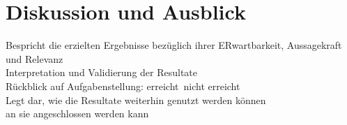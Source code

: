 
\chapter{Diskussion und Ausblick}\label{chap.diskussion}

Bespricht die erzielten Ergebnisse bezüglich ihrer ERwartbarkeit, Aussagekraft und Relevanz\\
Interpretation und Validierung der Resultate\\
Rückblick auf Aufgabenstellung: erreicht\ nicht erreicht\\

Legt dar, wie die Resultate weiterhin genutzt werden können\\ an sie angeschlossen werden kann\\
